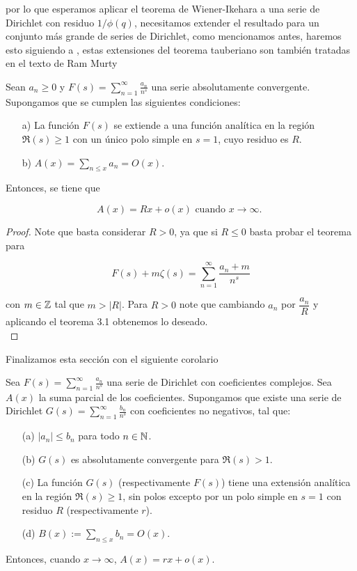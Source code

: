 por lo que esperamos aplicar el teorema de Wiener-Ikehara a una serie de Dirichlet con residuo $1/\phi(q)$, necesitamos extender el resultado para un conjunto más grande de series de Dirichlet, como mencionamos antes, haremos esto siguiendo a \cite{vatwani2015simple}, estas extensiones del teorema tauberiano son también tratadas en el texto de Ram Murty \cite{murty2007problems}

\begin{corollary}
    Sean $a_n \geq 0$ y $F(s)=\displaystyle\sum_{n=1}^{\infty} \frac{a_n}{n^s}$ una serie absolutamente convergente. Supongamos que se cumplen las siguientes condiciones:

\begin{itemize}
\item[a)] La función $F(s)$ se extiende a una función analítica en la región $\Re(s) \geq 1$ con un único polo simple en $s=1$, cuyo residuo es $R$.
\item[b)] $A(x)=\displaystyle \sum_{n \leq x} a_n=O(x)$.
\end{itemize}


Entonces, se tiene que

$$
A(x)=Rx+o(x) \text { cuando } x \rightarrow \infty \text {. }
$$
\end{corollary}

\begin{proof}
    Note que basta considerar $R> 0$, ya que si $R\leq 0$ basta probar el teorema para 

    $$F(s)+m\zeta(s)=\sum_{n=1}^{\infty} \frac{a_n+m}{n^s}$$

    con $m\in \mathbb{Z}$ tal que $m>|R|$. Para $R>0$ note que cambiando $a_n$ por $\dfrac{a_n}{R}$ y aplicando el teorema 3.1 obtenemos lo deseado.\\
\end{proof}

Finalizamos esta sección con el siguiente corolario

\begin{corollary}
Sea $
F(s) =\displaystyle \sum_{n=1}^{\infty} \frac{a_n}{n^s}
$ una serie de Dirichlet con coeficientes complejos. Sea $A(x)$ la suma parcial de los coeficientes. Supongamos que existe una serie de Dirichlet $
G(s) = \displaystyle\sum_{n=1}^{\infty} \frac{b_n}{n^s}
$ con coeficientes no negativos, tal que:  

\begin{itemize}
    \item[(a)] $\left|a_n\right| \leq b_n$ para todo $n\in \mathbb{N}$.
    \item[(b)] $G(s)$ es absolutamente convergente para $\Re(s) > 1$.
    \item[(c)] La función $G(s)$ (respectivamente $F(s)$) tiene una extensión analítica en la región $\Re(s) \geq 1$, sin polos excepto por un polo simple en $s = 1$ con residuo $R$ (respectivamente $r$).
    \item[(d)] $B(x):=\displaystyle\sum_{n \leq x}b_n=O(x)$.
\end{itemize}

Entonces, cuando $x \rightarrow \infty$, $
A(x) = r x + o(x).
$
\end{corollary}


